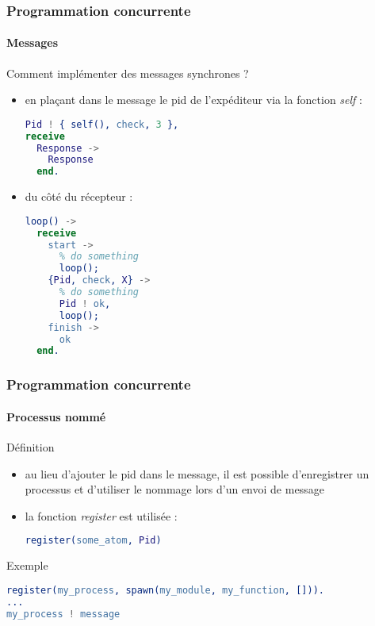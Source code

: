 \begin{frame}[fragile]
  \frametitle{Programmation concurrente}
  \framesubtitle{Messages}

  \begin{exampleblock}{Comment implémenter des messages synchrones ?}
    \begin{itemize}
    \item en plaçant dans le message le pid de l'expéditeur via la fonction
      \textit{self} :
      \begin{lstlisting}[language=erlang]
Pid ! { self(), check, 3 },
receive
  Response ->
    Response
  end.
      \end{lstlisting}
    \item du côté du récepteur :
      \begin{lstlisting}[language=erlang]
loop() ->
  receive
    start ->
      % do something
      loop();
    {Pid, check, X} ->
      % do something
      Pid ! ok,
      loop();
    finish ->
      ok
  end.
      \end{lstlisting}
    \end{itemize}
  \end{exampleblock}

\end{frame}

\begin{frame}[fragile]
  \frametitle{Programmation concurrente}
  \framesubtitle{Processus nommé}

  \begin{block}{Définition}
    \begin{itemize}
    \item au lieu d'ajouter le pid dans le message, il est possible
      d'enregistrer un processus et d'utiliser le nommage lors d'un envoi
      de message
    \item la fonction \textit{register} est utilisée :
      \begin{lstlisting}[language=erlang]
register(some_atom, Pid)
      \end{lstlisting}
    \end{itemize}
  \end{block}

  \begin{exampleblock}{Exemple}
    \begin{lstlisting}[language=erlang]
register(my_process, spawn(my_module, my_function, [])).
...
my_process ! message
    \end{lstlisting}
  \end{exampleblock}

\end{frame}
